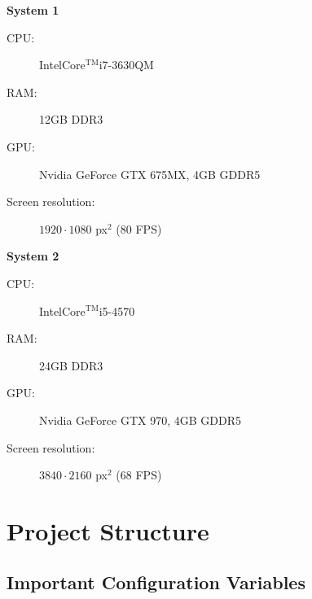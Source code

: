 \documentclass[11pt,a4paper]{article}
\begin{document}
        	\textbf{System 1}
            \begin{description}
            	\item[CPU:] Intel\textregistered Core$^{\text{TM}}$i7-3630QM
                \item[RAM:] 12GB DDR3
                \item[GPU:] Nvidia GeForce GTX 675MX, 4GB GDDR5
                \item[Screen resolution:] $1920 \cdot 1080$ px$^2$ (80 FPS)
            \end{description}
            
            \bigskip
            
			\textbf{System 2}
            \begin{description}
            	\item[CPU:] Intel\textregistered Core$^{\text{TM}}$i5-4570
                \item[RAM:] 24GB DDR3
                \item[GPU:] Nvidia GeForce GTX 970, 4GB GDDR5
                \item[Screen resolution:] $3840 \cdot 2160$ px$^2$ (68 FPS)
            \end{description}
    	
        
    \section{Project Structure}
           
        \subsection{Important Configuration Variables}
        
\end{document}
